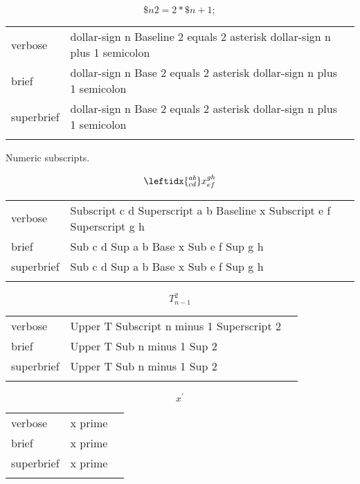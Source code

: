\R
\E \[\$ n2=2\ast\$ n+1;\]
\begin{longtable}[c]{@{}lll@{}}
\toprule\addlinespace
verbose & dollar-sign n Baseline 2 equals 2 asterisk dollar-sign n plus
1 semicolon &

\\\addlinespace
brief & dollar-sign n Base 2 equals 2 asterisk dollar-sign n plus 1
semicolon &

\\\addlinespace
superbrief & dollar-sign n Base 2 equals 2 asterisk dollar-sign n plus 1
semicolon &

\\\addlinespace
\bottomrule
\end{longtable}


\R
Numeric subscripts.

\R
\E \[\leftidx{_{cd}^{ab}}x_{ef}^{gh}\]
\begin{longtable}[c]{@{}lll@{}}
\toprule\addlinespace
verbose & Subscript c d Superscript a b Baseline x Subscript e f
Superscript g h &

\\\addlinespace
brief & Sub c d Sup a b Base x Sub e f Sup g h &

\\\addlinespace
superbrief & Sub c d Sup a b Base x Sub e f Sup g h &

\\\addlinespace
\bottomrule
\end{longtable}


\E \[T_{n-1}^{2}\]
\begin{longtable}[c]{@{}lll@{}}
\toprule\addlinespace
verbose & Upper T Subscript n minus 1 Superscript 2 &

\\\addlinespace
brief & Upper T Sub n minus 1 Sup 2 &

\\\addlinespace
superbrief & Upper T Sub n minus 1 Sup 2 &

\\\addlinespace
\bottomrule
\end{longtable}


\R
\E \[x^\prime\]
\begin{longtable}[c]{@{}lll@{}}
\toprule\addlinespace
verbose & x prime &

\\\addlinespace
brief & x prime &

\\\addlinespace
superbrief & x prime &

\\\addlinespace
\bottomrule
\end{longtable}


